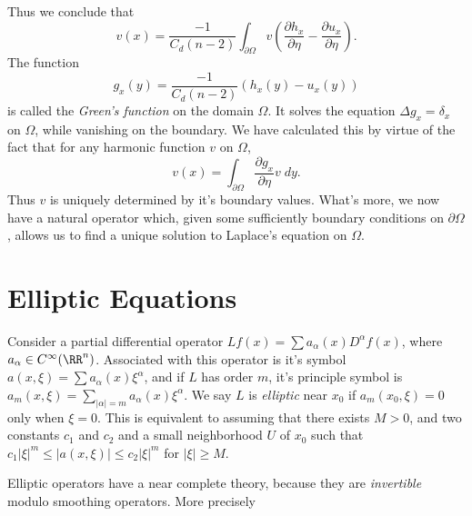 %
Thus we conclude that
%
\[ v(x) = \frac{-1}{C_d (n-2)} \int_{\partial \Omega} v \left( \frac{\partial h_x}{\partial \eta} - \frac{\partial u_x}{\partial \eta} \right). \]
%
The function
%
\[ g_x(y) = \frac{-1}{C_d (n-2)} (h_x(y) - u_x(y)) \]
%
is called the \emph{Green's function} on the domain $\Omega$. It solves the equation $\Delta g_x = \delta_x$ on $\Omega$, while vanishing on the boundary. We have calculated this by virtue of the fact that for any harmonic function $v$ on $\Omega$,
%
\[ v(x) = \int_{\partial \Omega} \frac{\partial g_x}{\partial \eta} v\; dy. \]
%
Thus $v$ is uniquely determined by it's boundary values. What's more, we now have a natural operator which, given some sufficiently boundary conditions on $\partial \Omega$, allows us to find a unique solution to Laplace's equation on $\Omega$.




\chapter{Elliptic Equations}

Consider a partial differential operator $L f(x) = \sum a_\alpha(x) D^\alpha f(x)$, where $a_\alpha \in C^\infty(\RR^n)$. Associated with this operator is it's symbol $a(x,\xi) = \sum a_\alpha(x) \xi^\alpha$, and if $L$ has order $m$, it's principle symbol is $a_m(x,\xi) = \sum_{|\alpha| = m} a_\alpha(x) \xi^\alpha$. We say $L$ is \emph{elliptic} near $x_0$ if $a_m(x_0,\xi) = 0$ only when $\xi = 0$. This is equivalent to assuming that there exists $M > 0$, and two constants $c_1$ and $c_2$ and a small neighborhood $U$ of $x_0$ such that $c_1 |\xi|^m \leq |a(x,\xi)| \leq c_2 |\xi|^m$ for $|\xi| \geq M$.

Elliptic operators have a near complete theory, because they are \emph{invertible} modulo smoothing operators. More precisely

